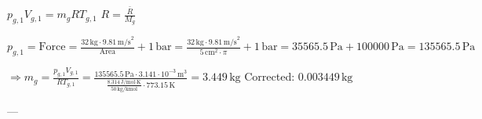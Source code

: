 \( p_{g,1} V_{g,1} = m_g R T_{g,1} \)  
\( R = \frac{\bar{R}}{M_g} \)  

\( p_{g,1} = \text{Force} = \frac{32 \, \text{kg} \cdot 9.81 \, \text{m/s}^2}{\text{Area}} + 1 \, \text{bar} = \frac{32 \, \text{kg} \cdot 9.81 \, \text{m/s}^2}{5 \, \text{cm}^2 \cdot \pi} + 1 \, \text{bar} = 35565.5 \, \text{Pa} + 100000 \, \text{Pa} = 135565.5 \, \text{Pa} \)  

\( \Rightarrow m_g = \frac{p_{g,1} V_{g,1}}{R T_{g,1}} = \frac{135565.5 \, \text{Pa} \cdot 3.141 \cdot 10^{-3} \, \text{m}^3}{\frac{8.314 \, \text{J/mol·K}}{50 \, \text{kg/kmol}} \cdot 773.15 \, \text{K}} = 3.449 \, \text{kg} \)  
Corrected: \( 0.003449 \, \text{kg} \)  

---